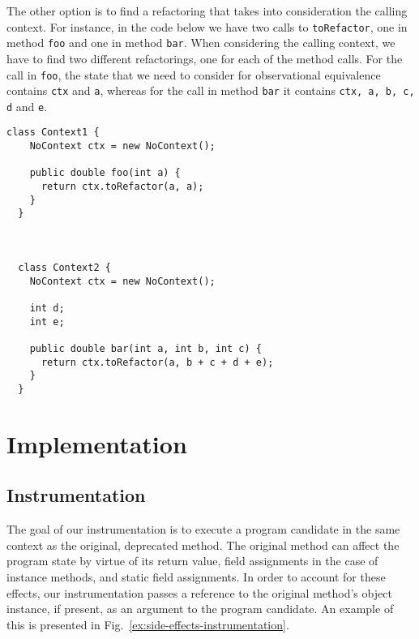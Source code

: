 \documentclass[runningheads,a4paper]{llncs}
\begin{document}
The other option is to find a refactoring that takes into consideration
the calling context. For instance, in the code below we have two
calls to \texttt{toRefactor}, one in method \texttt{foo} and one in
method \texttt{bar}. When considering the calling context, we have to
find two different refactorings, one for each of the method calls.
For the call in \texttt{foo}, the state that we need to consider for observational
equivalence contains \texttt{ctx} and \texttt{a}, whereas for the call in method
\texttt{bar} it contains \texttt{ctx, a, b, c, d} and \texttt{e}.

\begin{lstlisting}[mathescape=true]
  class Context1 {
    NoContext ctx = new NoContext();

    public double foo(int a) {
      return ctx.toRefactor(a, a);
    }
  }

 

  class Context2 {
    NoContext ctx = new NoContext();

    int d;
    int e;

    public double bar(int a, int b, int c) {
      return ctx.toRefactor(a, b + c + d + e);
    }
  }
\end{lstlisting}






\section{Implementation}

\subsection{Instrumentation}

The goal of our instrumentation is to execute a program candidate in
the same context as the original, deprecated method. The original
method can affect the program state by virtue of its return value,
field assignments in the case of instance methods, and static field
assignments. In order to account for these effects, our
instrumentation passes a reference to the original method's object
instance, if present, as an argument to the program candidate.
An example of this is presented in
Fig.~\ref{ex:side-effects-instrumentation}.
\end{document}
